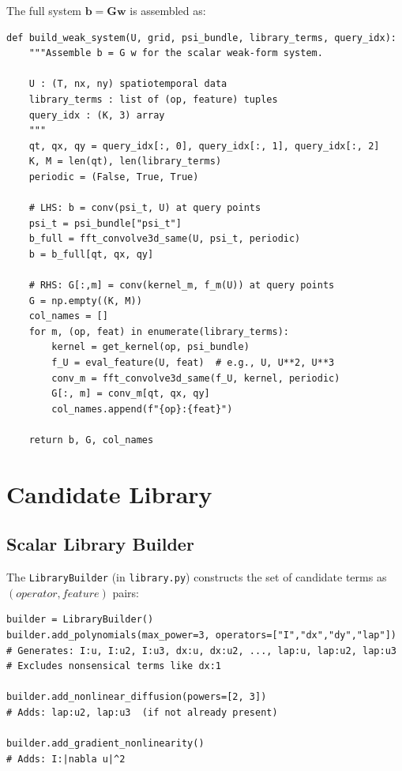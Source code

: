 \documentclass[11pt]{article}
\begin{document}
The full system $\mathbf{b} = \mathbf{G}\mathbf{w}$ is assembled as:

\begin{lstlisting}[caption={system.py --- build\_weak\_system}]
def build_weak_system(U, grid, psi_bundle, library_terms, query_idx):
    """Assemble b = G w for the scalar weak-form system.

    U : (T, nx, ny) spatiotemporal data
    library_terms : list of (op, feature) tuples
    query_idx : (K, 3) array
    """
    qt, qx, qy = query_idx[:, 0], query_idx[:, 1], query_idx[:, 2]
    K, M = len(qt), len(library_terms)
    periodic = (False, True, True)

    # LHS: b = conv(psi_t, U) at query points
    psi_t = psi_bundle["psi_t"]
    b_full = fft_convolve3d_same(U, psi_t, periodic)
    b = b_full[qt, qx, qy]

    # RHS: G[:,m] = conv(kernel_m, f_m(U)) at query points
    G = np.empty((K, M))
    col_names = []
    for m, (op, feat) in enumerate(library_terms):
        kernel = get_kernel(op, psi_bundle)
        f_U = eval_feature(U, feat)  # e.g., U, U**2, U**3
        conv_m = fft_convolve3d_same(f_U, kernel, periodic)
        G[:, m] = conv_m[qt, qx, qy]
        col_names.append(f"{op}:{feat}")

    return b, G, col_names
\end{lstlisting}


\section{Candidate Library}
\label{sec:library}

\subsection{Scalar Library Builder}

The \texttt{LibraryBuilder} (in \texttt{library.py}) constructs the set of
candidate terms as $(operator, feature)$ pairs:

\begin{lstlisting}[caption={library.py --- LibraryBuilder usage}]
builder = LibraryBuilder()
builder.add_polynomials(max_power=3, operators=["I","dx","dy","lap"])
# Generates: I:u, I:u2, I:u3, dx:u, dx:u2, ..., lap:u, lap:u2, lap:u3
# Excludes nonsensical terms like dx:1

builder.add_nonlinear_diffusion(powers=[2, 3])
# Adds: lap:u2, lap:u3  (if not already present)

builder.add_gradient_nonlinearity()
# Adds: I:|nabla u|^2
\end{lstlisting}
\end{document}

